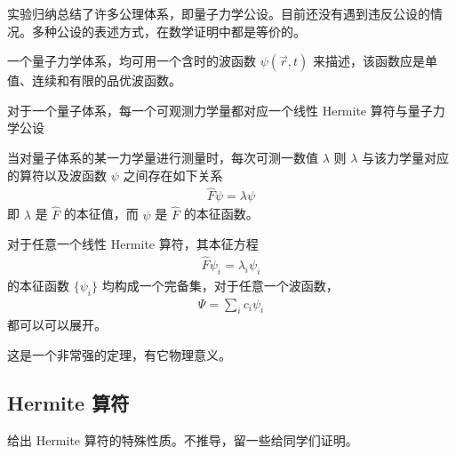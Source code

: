实验归纳总结了许多公理体系，即量子力学公设。目前还没有遇到违反公设的情况。多种公设的表述方式，在数学证明中都是等价的。

\begin{theorem}[公设1]
    一个量子力学体系，均可用一个含时的波函数 $\psi(\vec r, t)$ 来描述，该函数应是单值、连续和有限的品优波函数。
\end{theorem}

\begin{theorem}[公设2]
对于一个量子体系，每一个可观测力学量都对应一个线性 Hermite 算符与量子力学公设
\end{theorem}

\begin{theorem}[公设3]
当对量子体系的某一力学量进行测量时，每次可测一数值 $\lambda$ 则 $\lambda$ 与该力学量对应的算符以及波函数 $\psi$ 之间存在如下关系
\begin{eqnarray}
    \hat F \psi =\lambda \psi
\end{eqnarray}
即 $\lambda$ 是 $\hat F$ 的本征值，而 $\psi$ 是 $\hat F$ 的本征函数。
\end{theorem}


\begin{theorem}[公设4]
对于任意一个线性 Hermite 算符，其本征方程
\begin{eqnarray}
    \hat F \psi_i = \lambda_i \psi_i
\end{eqnarray}
的本征函数 $\{\psi_i\}$ 均构成一个完备集，对于任意一个波函数，
\begin{eqnarray}
    \Psi = \sum_i c_i \psi_i
\end{eqnarray}
都可以可以展开。
\end{theorem}

这是一个非常强的定理，有它物理意义。

\subsection{Hermite 算符}
给出 Hermite 算符的特殊性质。不推导，留一些给同学们证明。

